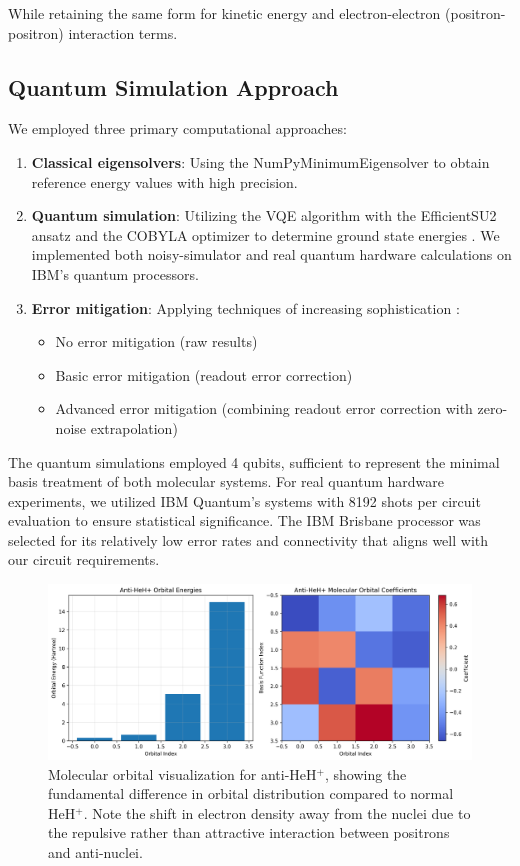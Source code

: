 \documentclass[10pt,twocolumn,a4paper]{article}
\begin{document}
While retaining the same form for kinetic energy and electron-electron (positron-positron) interaction terms.

\subsection{Quantum Simulation Approach}
We employed three primary computational approaches:

\begin{enumerate}
    \item \textbf{Classical eigensolvers}: Using the NumPyMinimumEigensolver to obtain reference energy values with high precision.
    
    \item \textbf{Quantum simulation}: Utilizing the VQE algorithm with the EfficientSU2 ansatz and the COBYLA optimizer to determine ground state energies \cite{kandala2017hardware}. We implemented both noisy-simulator and real quantum hardware calculations on IBM's quantum processors.
    
    \item \textbf{Error mitigation}: Applying techniques of increasing sophistication \cite{temme2017error, sharma2020noise}:
    \begin{itemize}
        \item No error mitigation (raw results)
        \item Basic error mitigation (readout error correction)
        \item Advanced error mitigation (combining readout error correction with zero-noise extrapolation)
    \end{itemize}
\end{enumerate}

The quantum simulations employed 4 qubits, sufficient to represent the minimal basis treatment of both molecular systems. For real quantum hardware experiments, we utilized IBM Quantum's systems with 8192 shots per circuit evaluation to ensure statistical significance. The IBM Brisbane processor was selected for its relatively low error rates and connectivity that aligns well with our circuit requirements.

\begin{figure}[t!]
    \centering
    \includegraphics[width=\columnwidth]{graphs/anti_heh_orbitals.png}
    \caption{Molecular orbital visualization for anti-HeH$^+$, showing the fundamental difference in orbital distribution compared to normal HeH$^+$. Note the shift in electron density away from the nuclei due to the repulsive rather than attractive interaction between positrons and anti-nuclei.}
    \label{fig:orbitals}
\end{figure}
\end{document}
